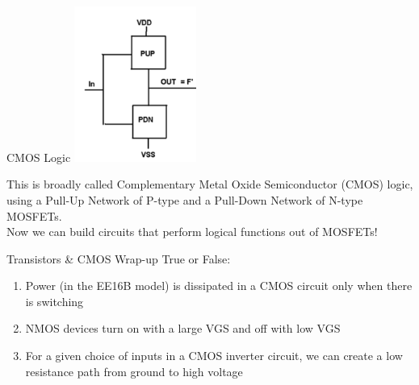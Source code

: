 \begin{frame}{CMOS Logic}
	\includegraphics[width=0.3\textwidth]{./images/cmos.png}
	
	This is broadly called Complementary Metal Oxide Semiconductor (CMOS) logic, using a Pull-Up Network of P-type and a Pull-Down Network of N-type MOSFETs.
	\\
	Now we can build circuits that perform logical functions out of MOSFETs!
\end{frame}

\begin{frame}{Transistors \& CMOS Wrap-up}
	True or False:
	\begin{enumerate}
	    \item<1-> Power (in the EE16B model) is dissipated in a CMOS circuit only when there is switching \\
	    \onslide<2->{\textbf{True}}
	    \item<1-> NMOS devices turn on with a large VGS and off with low VGS \\
	    \onslide<3->{\textbf{True}}
        \item<1-> For a given choice of inputs in a CMOS inverter circuit, we can create a low resistance path from ground to high voltage \\
	    \onslide<4->{\textbf{False}}
	\end{enumerate}
\end{frame}
